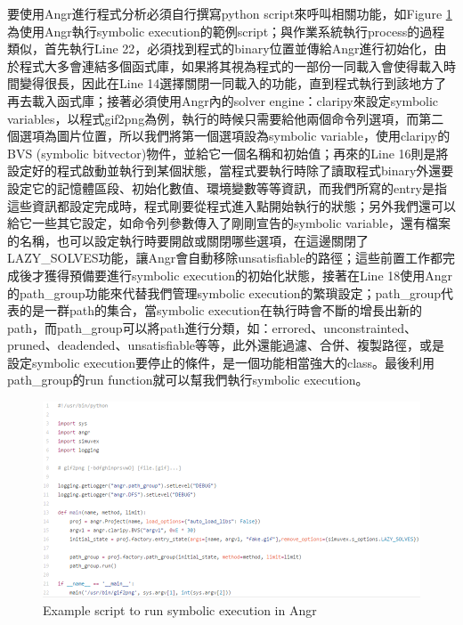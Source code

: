 \documentclass[12pt,a4paper,oneside]{book}
\begin{document}
要使用Angr進行程式分析必須自行撰寫python script來呼叫相關功能，如Figure \ref{figScript}為使用Angr執行symbolic execution的範例script；與作業系統執行process的過程類似，首先執行Line 22，必須找到程式的binary位置並傳給Angr進行初始化，由於程式大多會連結多個函式庫，如果將其視為程式的一部份一同載入會使得載入時間變得很長，因此在Line 14選擇關閉一同載入的功能，直到程式執行到該地方了再去載入函式庫；接著必須使用Angr內的solver engine：claripy來設定symbolic variables，以程式gif2png為例，執行的時候只需要給他兩個命令列選項，而第二個選項為圖片位置，所以我們將第一個選項設為symbolic variable，使用claripy的BVS (symbolic bitvector)物件，並給它一個名稱和初始值；再來的Line 16則是將設定好的程式啟動並執行到某個狀態，當程式要執行時除了讀取程式binary外還要設定它的記憶體區段、初始化數值、環境變數等等資訊，而我們所寫的entry是指這些資訊都設定完成時，程式剛要從程式進入點開始執行的狀態；另外我們還可以給它一些其它設定，如命令列參數傳入了剛剛宣告的symbolic variable，還有檔案的名稱，也可以設定執行時要開啟或關閉哪些選項，在這邊關閉了LAZY\_SOLVES功能，讓Angr會自動移除unsatisfiable的路徑；這些前置工作都完成後才獲得預備要進行symbolic execution的初始化狀態，接著在Line 18使用Angr的path\_group功能來代替我們管理symbolic execution的繁瑣設定；path\_group代表的是一群path的集合，當symbolic execution在執行時會不斷的增長出新的path，而path\_group可以將path進行分類，如：errored、unconstrainted、pruned、deadended、unsatisfiable等等，此外還能過濾、合併、複製路徑，或是設定symbolic execution要停止的條件，是一個功能相當強大的class。最後利用path\_group的run function就可以幫我們執行symbolic execution。

\begin{figure}[htbp]
\center
\includegraphics[width=\textwidth]{figures/script.png}
\caption{Example script to run symbolic execution in Angr \label{figScript}}
\end{figure}

\end{document}
